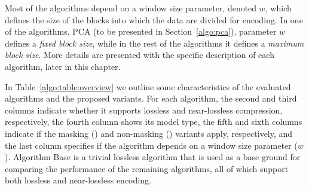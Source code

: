 Most of the algorithms depend on a window size parameter, denoted $w$, which defines the size of the blocks into which the data are divided for encoding. In one of the algorithms, PCA (to be presented in Section~\ref{algo:pca}), parameter $w$ defines a \textit{fixed block size}, while in the rest of the algorithms it defines a \textit{maximum block size}. More details are presented with the specific description of each algorithm, later in this chapter.


In Table~\ref{algo:table:overview} we outline some characteristics of the evaluated algorithms and the proposed variants. For each algorithm, the second and third columns indicate whether it supports lossless and near-lossless compression, respectively, the fourth column shows its model type, the fifth and sixth columns indicate if the masking (\maskalgo) and non-masking (\NOmaskalgo) variants apply, respectively, and the last column specifies if the algorithm depends on a window size parameter ($w$). Algorithm Base is a trivial lossless algorithm that is used as a base ground for comparing the performance of the remaining algorithms, all of which support both lossless and near-lossless encoding.


\clearpage




